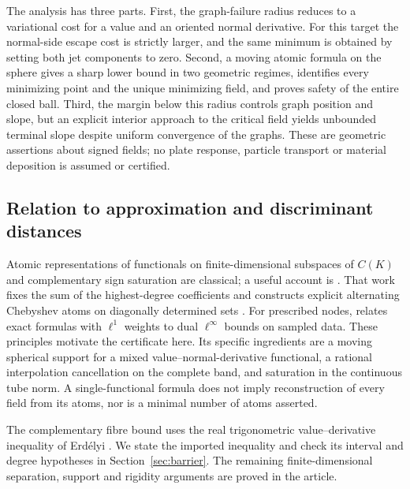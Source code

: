 \documentclass[11pt,a4paper]{article}
\begin{document}
The analysis has three parts. First, the graph-failure radius reduces
to a variational cost for a value and an oriented normal derivative.
For this target the normal-side escape cost is strictly larger, and
the same minimum is obtained by setting both jet components to zero.
Second, a moving atomic formula on the sphere gives a sharp lower
bound in two geometric regimes, identifies every minimizing point
and the unique minimizing field, and proves safety of the entire
closed ball. Third, the margin below this radius controls graph
position and slope, but an explicit interior approach to the critical
field yields unbounded terminal slope despite uniform convergence
of the graphs. These are geometric assertions about signed fields;
no plate response, particle transport or material deposition is
assumed or certified.

\subsection{Relation to approximation and discriminant distances}

Atomic representations of functionals on finite-dimensional subspaces
of $C(K)$ and complementary sign saturation are classical; a useful
account is \cite[Section 4.2]{Dressler}. That work fixes the sum of the
highest-degree coefficients and constructs explicit alternating
Chebyshev atoms on diagonally determined sets
\cite[Theorem 4.8]{Dressler}. For prescribed nodes,
\cite[Theorem 9]{DavydovSchaback} relates exact formulas with
$\ell^1$ weights to dual $\ell^\infty$ bounds on sampled data.
These principles motivate the
certificate here. Its specific ingredients are a moving spherical
support for a mixed value--normal-derivative functional, a rational
interpolation cancellation on the complete band, and saturation in
the continuous tube norm. A single-functional formula does not imply
reconstruction of every field from its atoms, nor is a minimal number
of atoms asserted.

The complementary fibre bound uses the real trigonometric
value--derivative inequality of Erd\'elyi
\cite[Theorem 2.1]{Erdelyi}. We state the imported inequality and check
its interval and degree hypotheses in Section~\ref{sec:barrier}.
The remaining finite-dimensional separation, support and rigidity
arguments are proved in the article.
\end{document}
